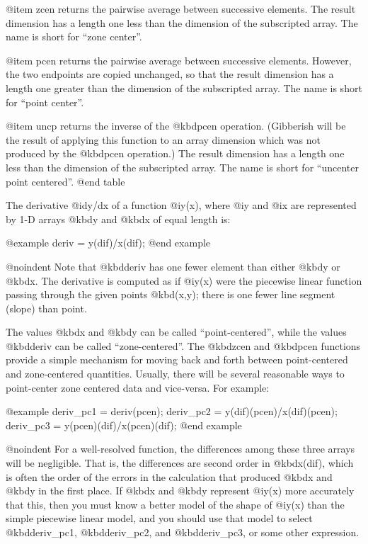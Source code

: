 @item zcen
returns the pairwise average between successive elements.  The result
dimension has a length one less than the dimension of the subscripted
array.  The name is short for ``zone center''.

@item pcen
returns the pairwise average between successive elements.  However, the
two endpoints are copied unchanged, so that the result dimension has a
length one greater than the dimension of the subscripted array.  The
name is short for ``point center''.

@item uncp
returns the inverse of the @kbd{pcen} operation.  (Gibberish will be the
result of applying this function to an array dimension which was not
produced by the @kbd{pcen} operation.)  The result dimension has a
length one less than the dimension of the subscripted array.  The name
is short for ``uncenter point centered''.
@end table

The derivative @i{dy/dx} of a function @i{y(x)}, where @i{y} and @i{x}
are represented by 1-D arrays @kbd{y} and @kbd{x} of equal length is:

@example
deriv = y(dif)/x(dif);
@end example

@noindent
Note that @kbd{deriv} has one fewer element than either @kbd{y} or
@kbd{x}.  The derivative is computed as if @i{y(x)} were the piecewise
linear function passing through the given points @kbd{(x,y)}; there is
one fewer line segment (slope) than point.

The values @kbd{x} and @kbd{y} can be called ``point-centered'', while the
values @kbd{deriv} can be called ``zone-centered''.  The @kbd{zcen} and
@kbd{pcen} functions provide a simple mechanism for moving back and
forth between point-centered and zone-centered quantities.  Usually,
there will be several reasonable ways to point-center zone centered data
and vice-versa.  For example:

@example
deriv_pc1 = deriv(pcen);
deriv_pc2 = y(dif)(pcen)/x(dif)(pcen);
deriv_pc3 = y(pcen)(dif)/x(pcen)(dif);
@end example

@noindent
For a well-resolved function, the differences among these three arrays
will be negligible.  That is, the differences are second order in
@kbd{x(dif)}, which is often the order of the errors in the calculation
that produced @kbd{x} and @kbd{y} in the first place.  If @kbd{x} and
@kbd{y} represent @i{y(x)} more accurately that this, then you must know
a better model of the shape of @i{y(x)} than the simple piecewise linear
model, and you should use that model to select @kbd{deriv_pc1},
@kbd{deriv_pc2}, and @kbd{deriv_pc3}, or some other expression.

